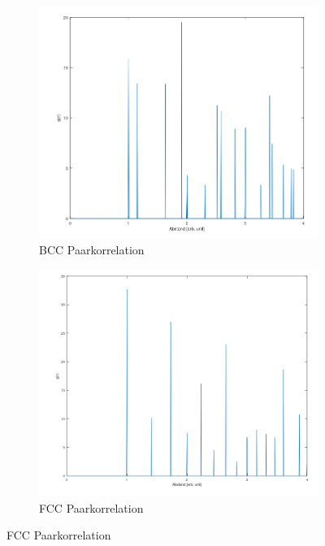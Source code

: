 \documentclass[12pt,a4paper,ngerman]{article}
\begin{document}
\begin{figure}
	\begin{subfigure}[b]{0.3\textwidth}
	\includegraphics[width=\textwidth]{data/BCC_perfect_paarcorr.png}
	\caption{BCC Paarkorrelation}
	\end{subfigure}
	\hfill %
	\begin{subfigure}[b]{0.3\textwidth}
		\includegraphics[width=\textwidth]{data/FCC_perfect_paarcorr.png}
		\caption{FCC Paarkorrelation}
	\end{subfigure}

\end{figure}
\end{document}
